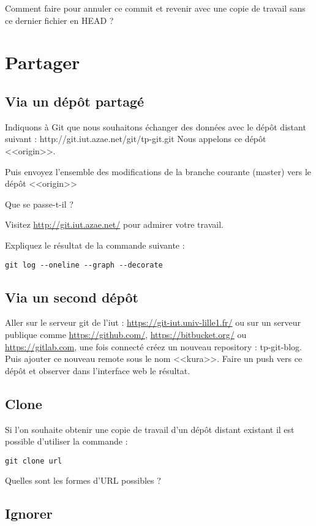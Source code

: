 \documentclass[a4paper]{article}
\begin{document}
Comment faire pour annuler ce commit et revenir avec une copie de travail sans ce dernier fichier en HEAD ?

\section{Partager}

\subsection{Via un dépôt partagé}

Indiquons à Git que nous souhaitons échanger des données avec le dépôt distant suivant : http://git.iut.azae.net/git/tp-git.git
Nous appelons ce dépôt <<origin>>.

Puis envoyez l'ensemble des modifications de la branche courante (master) vers le dépôt <<origin>>

Que se passe-t-il ?

Visitez \url{http://git.iut.azae.net/} pour admirer votre travail.

Expliquez le résultat de la commande suivante : 
\begin{verbatim}
git log --oneline --graph --decorate
\end{verbatim}

\subsection{Via un second dépôt}

Aller sur le serveur git de l'iut : \url{https://git-iut.univ-lille1.fr/} ou sur un serveur publique comme \url{https://github.com/}, \url{https://bitbucket.org/} ou \url{https://gitlab.com}, une fois connecté créez un nouveau repository : tp-git-blog. Puis ajouter ce nouveau remote sous le nom <<kura>>. Faire un push vers ce dépôt et observer dans l'interface web le résultat.

\subsection{Clone}
Si l'on souhaite obtenir une copie de travail d'un dépôt distant existant il est possible d'utiliser la commande :
\begin{verbatim}
git clone url
\end{verbatim}

Quelles sont les formes d'URL possibles ?

\subsection{Ignorer}
\end{document}
